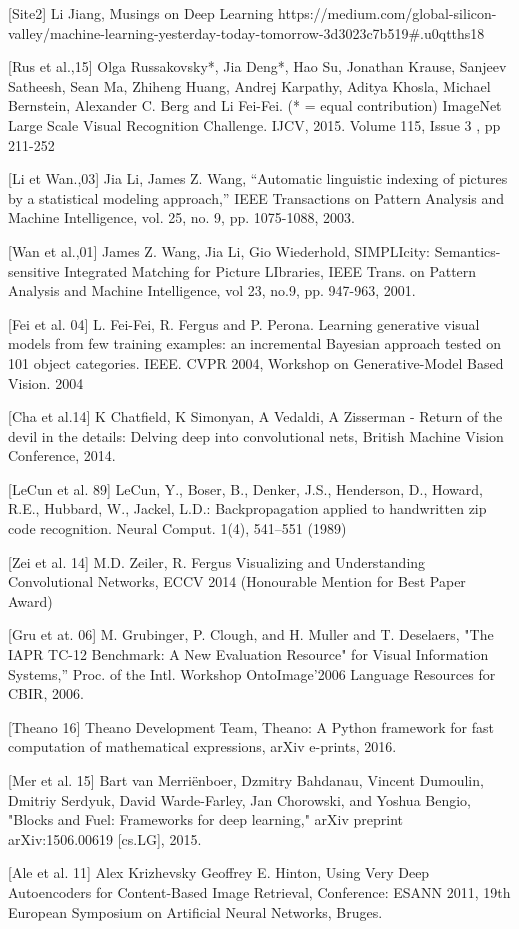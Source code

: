 [Site2] Li Jiang, Musings on Deep Learning https://medium.com/global-silicon-valley/machine-learning-yesterday-today-tomorrow-3d3023c7b519\#.u0qtths18


[Rus et al.,15] Olga Russakovsky*, Jia Deng*, Hao Su, Jonathan Krause, Sanjeev Satheesh, Sean Ma, Zhiheng Huang, Andrej Karpathy, Aditya Khosla, Michael Bernstein, Alexander C. Berg and Li Fei-Fei. (* = equal contribution) ImageNet Large Scale Visual Recognition Challenge. IJCV, 2015. Volume 115, Issue 3 , pp 211-252 

[Li et Wan.,03] Jia Li, James Z. Wang, ``Automatic linguistic indexing of pictures by a statistical modeling approach,'' IEEE Transactions on Pattern Analysis and Machine Intelligence, vol. 25, no. 9, pp. 1075-1088, 2003.

[Wan et al.,01] James Z. Wang, Jia Li, Gio Wiederhold, SIMPLIcity: Semantics-sensitive Integrated Matching for Picture LIbraries, IEEE Trans. on Pattern Analysis and Machine Intelligence, vol 23, no.9, pp. 947-963, 2001.

[Fei et al. 04] L. Fei-Fei, R. Fergus and P. Perona. Learning generative visual models from few training examples: an incremental Bayesian approach tested on 101 object categories. IEEE. CVPR 2004, Workshop on Generative-Model Based Vision. 2004

[Cha et al.14] K Chatfield, K Simonyan, A Vedaldi, A Zisserman - Return of the devil in the details: Delving deep into convolutional nets, British Machine Vision Conference, 2014.

[LeCun et al. 89] LeCun, Y., Boser, B., Denker, J.S., Henderson, D., Howard, R.E., Hubbard, W., Jackel, L.D.: Backpropagation applied to handwritten zip code recognition. Neural
Comput. 1(4), 541–551 (1989)

[Zei et al. 14] M.D. Zeiler, R. Fergus Visualizing and Understanding Convolutional Networks, ECCV 2014 (Honourable Mention for Best Paper Award)

[Gru et at. 06] M. Grubinger, P. Clough, and H. Muller and T. Deselaers, "The IAPR TC-12 Benchmark: A New Evaluation Resource" for Visual Information Systems,” Proc. of the Intl. Workshop OntoImage’2006 Language Resources for CBIR, 2006.

[Theano 16] Theano Development Team, Theano: A {Python} framework for fast computation of mathematical expressions, arXiv e-prints, 2016.

[Mer et al. 15] Bart van Merriënboer, Dzmitry Bahdanau, Vincent Dumoulin, Dmitriy Serdyuk, David Warde-Farley, Jan Chorowski, and Yoshua Bengio, "Blocks and Fuel: Frameworks for deep learning," arXiv preprint arXiv:1506.00619 [cs.LG], 2015.

[Ale et al. 11] Alex Krizhevsky Geoffrey E. Hinton, Using Very Deep Autoencoders for Content-Based Image Retrieval, Conference: ESANN 2011, 19th European Symposium on Artificial Neural Networks, Bruges.